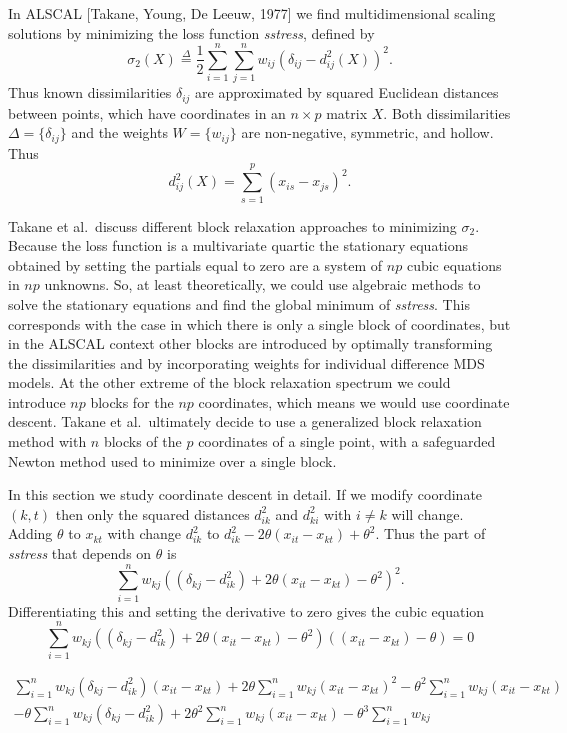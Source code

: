 \documentclass[
  12pt,
]{book}
\begin{document}
In ALSCAL {[}Takane, Young, De Leeuw, 1977{]} we find multidimensional scaling solutions by minimizing the loss function \emph{sstress}, defined by
\[
\sigma_2(X)\mathop{=}\limits^{\Delta}\frac12\sum_{i=1}^n\sum_{j=1}^nw_{ij}(\delta_{ij}-d_{ij}^2(X))^2.
\]
Thus known dissimilarities \(\delta_{ij}\) are approximated by squared Euclidean distances between points, which have coordinates in an \(n\times p\) matrix \(X\).
Both dissimilarities \(\Delta=\{\delta_{ij}\}\) and the weights \(W=\{w_{ij}\}\) are non-negative, symmetric, and hollow. Thus
\[
d_{ij}^2(X)=\sum_{s=1}^p (x_{is}-x_{js})^2.
\]

Takane et al.~discuss different block relaxation approaches to
minimizing \(\sigma_2\). Because the loss function is a multivariate quartic
the stationary equations obtained by setting the partials equal to zero are a system of \(np\) cubic equations in \(np\) unknowns. So, at least theoretically, we could use algebraic methods to solve the stationary equations and find the global minimum
of \emph{sstress}. This corresponds with the case in which there is only a single block of coordinates, but in the ALSCAL context other blocks are introduced by optimally transforming the dissimilarities and by incorporating weights for individual difference MDS models. At the other extreme of the block relaxation spectrum we could introduce \(np\) blocks for the \(np\) coordinates, which means we would use coordinate descent. Takane et al.~ultimately decide to use a generalized block relaxation method with \(n\) blocks of the \(p\) coordinates of a single point, with a safeguarded Newton method used to minimize over a single block.

In this section we study coordinate descent in detail. If we modify coordinate \((k,t)\) then only the squared distances \(d_{ik}^2\) and \(d_{ki}^2\) with \(i\not= k\) will change. Adding \(\theta\) to \(x_{kt}\) with change \(d_{ik}^2\)
to \(d_{ik}^2-2\theta(x_{it}-x_{kt})+\theta^2\). Thus the part of \emph{sstress} that depends on \(\theta\) is
\[
\sum_{i=1}^n w_{kj}((\delta_{kj}-d_{ik}^2)+2\theta(x_{it}-x_{kt})-\theta^2)^2.
\]
Differentiating this and setting the derivative to zero gives the cubic equation
\[
\sum_{i=1}^n w_{kj}((\delta_{kj}-d_{ik}^2)+2\theta(x_{it}-x_{kt})-\theta^2)((x_{it}-x_{kt})-\theta)=0
\]

\begin{multline*}
\sum_{i=1}^n w_{kj}(\delta_{kj}-d_{ik}^2)(x_{it}-x_{kt})+2\theta\sum_{i=1}^n w_{kj}(x_{it}-x_{kt})^2-\theta^2\sum_{i=1}^n w_{kj}(x_{it}-x_{kt})\\
-\theta\sum_{i=1}^n w_{kj}(\delta_{kj}-d_{ik}^2)+2\theta^2\sum_{i=1}^n w_{kj}(x_{it}-x_{kt})-\theta^3\sum_{i=1}^n w_{kj}
\end{multline*}
\end{document}
